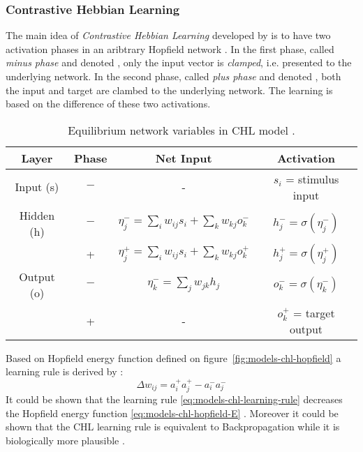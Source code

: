 \subsubsection{Contrastive Hebbian Learning}
\label{models-chl} 


The main idea of \emph{Contrastive Hebbian Learning} developed by \citet{movellan1990contrastive} is to have two activation phases in an aribtrary Hopfield network \citep{hopfield1984neurons}. In the first phase, called \emph{minus phase} and denoted \quotes{-}, only the input vector is \emph{clamped}, i.e. presented to the underlying network. In the second phase, called \emph{plus phase} and denoted \quotes{+}, both the input and target are clambed to the underlying network. The learning is based on the difference of these two activations. 

\begin{table}
  \centering
  \begin{tabular}{|cccc|}
    \hline
    Layer & Phase & Net Input & Activation\\
    \hline
    Input (s)    & $-$ & - & $s_i$ = stimulus input\\
    \hline
    Hidden (h)   & $-$ & \hspace{0.3cm}$\eta^{-}_j = \sum_i w_{ij}s_i + \sum_k w_{kj}o^{-}_k$\hspace{0.3cm} &
    $h^{-}_j = \sigma(\eta^{-}_j)$\hspace{0.3cm}\\
          &  +  & $\eta^{+}_j = \sum_{i}w_{ij}s_i + \sum_k w_{kj}o^{+}_k$ & $h^{+}_{j} = \sigma(\eta^{+}_j)$ \\
    \hline
    Output (o) & $-$ & $\eta^{-}_k = \sum_j w_{jk}h_j$ & $o^{-}_k = \sigma(\eta^{-}_k)$\\
           &  +  & - & $o^{+}_k$ = target output \\
    \hline
  \end{tabular}
  \caption{Equilibrium network variables in CHL model \citep{movellan1990contrastive}.}
  \label{tab:chl-states}
\end{table}


Based on Hopfield energy function defined on figure~\ref{fig:models-chl-hopfield} a learning rule is derived by \citet{movellan1990contrastive}: 
\begin{equation}
\label{eq:models-chl-learning-rule}
\Delta w_{ij} = a_i^{+}a_j^{+} - a_i^{-}a_j^{-}
\end{equation}
It could be shown that the learning rule \ref{eq:models-chl-learning-rule} decreases the Hopfield energy function \ref{eq:models-chl-hopfield-E} \citep{movellan1990contrastive}. Moreover it could be shown that the CHL learning rule is equivalent to Backpropagation while it is biologically more plausible \citep{o1996bio, o2001generalization}. 


